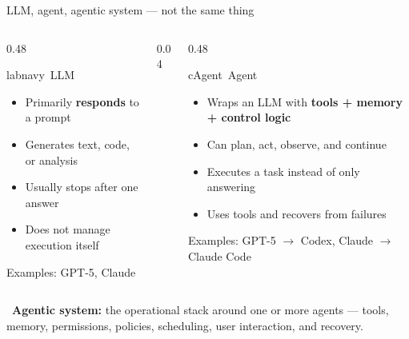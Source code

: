 \begin{frame}{LLM, agent, agentic system --- not the same thing}
  \begin{columns}[t, totalwidth=\textwidth]
    \begin{column}{0.48\textwidth}
      \begin{featbox}{labnavy}{\faComments\ LLM}
        \scriptsize
        \begin{itemize}
          \item Primarily \textbf{responds} to a prompt
          \item Generates text, code, or analysis
          \item Usually stops after one answer
          \item Does not manage execution itself
        \end{itemize}
        \vspace{1pt}
        {\scriptsize\color{midgray}Examples: GPT-5, Claude}
      \end{featbox}
    \end{column}
    \begin{column}{0.04\textwidth}\end{column}
    \begin{column}{0.48\textwidth}
      \begin{featbox}{cAgent}{\faRobot\ Agent}
        \scriptsize
        \begin{itemize}
          \item Wraps an LLM with \textbf{tools + memory + control logic}
          \item Can plan, act, observe, and continue
          \item Executes a task instead of only answering
          \item Uses tools and recovers from failures
        \end{itemize}
        \vspace{1pt}
        {\scriptsize\color{midgray}Examples: GPT-5 $\to$ Codex, Claude $\to$ Claude Code}
      \end{featbox}
    \end{column}
  \end{columns}
  \vspace{8pt}
  \begin{calloutbox}[accentteal]
    \small\faSitemap\ \textbf{Agentic system:} the operational stack around one
    or more agents --- tools, memory, permissions, policies, scheduling, user
    interaction, and recovery.
  \end{calloutbox}
\end{frame}

